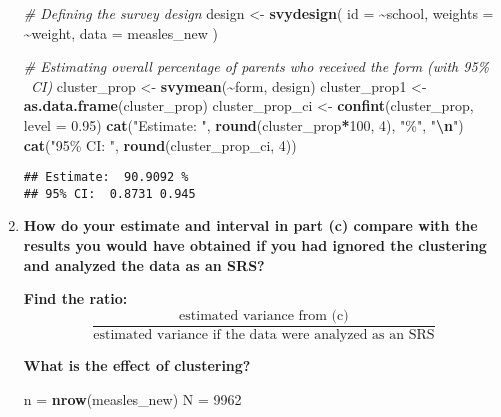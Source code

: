 \documentclass[]{article}
\newenvironment{Shaded}{\begin{snugshade}}{\end{snugshade}}
\newcommand{\AttributeTok}[1]{\textcolor[rgb]{0.13,0.29,0.53}{#1}}
\newcommand{\CommentTok}[1]{\textcolor[rgb]{0.56,0.35,0.01}{\textit{#1}}}
\newcommand{\DecValTok}[1]{\textcolor[rgb]{0.00,0.00,0.81}{#1}}
\newcommand{\FloatTok}[1]{\textcolor[rgb]{0.00,0.00,0.81}{#1}}
\newcommand{\FunctionTok}[1]{\textcolor[rgb]{0.13,0.29,0.53}{\textbf{#1}}}
\newcommand{\NormalTok}[1]{#1}
\newcommand{\OtherTok}[1]{\textcolor[rgb]{0.56,0.35,0.01}{#1}}
\newcommand{\SpecialCharTok}[1]{\textcolor[rgb]{0.81,0.36,0.00}{\textbf{#1}}}
\newcommand{\StringTok}[1]{\textcolor[rgb]{0.31,0.60,0.02}{#1}}
\begin{document}
\begin{enumerate}[label=(\alph*)]
\begin{Shaded}
\begin{Highlighting}[]
\CommentTok{\# Defining the survey design}
\NormalTok{design }\OtherTok{\textless{}{-}} \FunctionTok{svydesign}\NormalTok{(}
  \AttributeTok{id =} \SpecialCharTok{\textasciitilde{}}\NormalTok{school,}
  \AttributeTok{weights =} \SpecialCharTok{\textasciitilde{}}\NormalTok{weight,}
  \AttributeTok{data =}\NormalTok{ measles\_new}
\NormalTok{)}

\CommentTok{\# Estimating overall percentage of parents who received the form (with 95\%}
\CommentTok{\  CI)}
\NormalTok{cluster\_prop }\OtherTok{\textless{}{-}} \FunctionTok{svymean}\NormalTok{(}\SpecialCharTok{\textasciitilde{}}\NormalTok{form, design)}
\NormalTok{cluster\_prop1 }\OtherTok{\textless{}{-}} \FunctionTok{as.data.frame}\NormalTok{(cluster\_prop)}
\NormalTok{cluster\_prop\_ci }\OtherTok{\textless{}{-}} \FunctionTok{confint}\NormalTok{(cluster\_prop, }\AttributeTok{level =} \FloatTok{0.95}\NormalTok{)}
\FunctionTok{cat}\NormalTok{(}\StringTok{"Estimate: "}\NormalTok{, }\FunctionTok{round}\NormalTok{(cluster\_prop}\SpecialCharTok{*}\DecValTok{100}\NormalTok{, }\DecValTok{4}\NormalTok{), }\StringTok{"\%"}\NormalTok{, }\StringTok{"}\SpecialCharTok{\textbackslash{}n}\StringTok{"}\NormalTok{)}
\FunctionTok{cat}\NormalTok{(}\StringTok{"95\% CI: "}\NormalTok{, }\FunctionTok{round}\NormalTok{(cluster\_prop\_ci, }\DecValTok{4}\NormalTok{))}
\end{Highlighting}
\end{Shaded}

\begin{verbatim}
## Estimate:  90.9092 %
## 95% CI:  0.8731 0.945
\end{verbatim}

\newpage
\vspace{1em}
\item \textbf{How do your estimate and interval in part (c) compare with the results you would have obtained if you had ignored the clustering and analyzed the data as an SRS?} 

\vspace{0.1em}
\textbf{Find the ratio:
\[
\frac{\text{estimated variance from (c)}}{\text{estimated variance if the data were analyzed as an SRS}}
\]}

\vspace{0.1em}
\textbf{What is the effect of clustering?}

\begin{Shaded}
\begin{Highlighting}[]
\NormalTok{n }\OtherTok{=} \FunctionTok{nrow}\NormalTok{(measles\_new)}
\NormalTok{N }\OtherTok{=} \DecValTok{9962}


\end{Highlighting}
\end{Shaded}
\end{enumerate}
\end{document}
